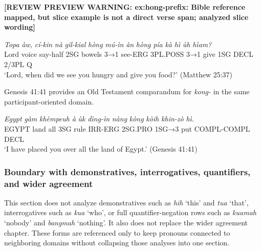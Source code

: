 \documentclass[
  11pt,
  a4paper,
]{article}
\newcommand{\tdim}[1]{\textit{#1}}
\newcommand{\tdimword}[1]{\textit{#1}}
\renewcommand{\textsc}[1]{{\footnotesize\MakeUppercase{#1}}}
\newcommand{\glossquote}[1]{`#1'}
\newcommand{\reviewwarninginline}[1]{\textbf{#1}\par\smallskip}
\begin{document}
\begin{exe}
\ex \label{ex:hong-prefix}
\reviewwarninginline{[REVIEW PREVIEW WARNING: ex:hong-prefix: Bible reference mapped, but slice example is not a direct verse span; analyzed slice wording]}
\gll \tdimword{Topa} \tdimword{àw,} \tdimword{cí-kin} \tdimword{nà} \tdimword{gil-kial} \tdimword{hòng} \tdimword{mú-ìn} \tdimword{àn} \tdimword{hòng} \tdimword{pía} \tdimword{kà} \tdimword{hì} \tdimword{ùh} \tdimword{hìam?} \\
     Lord voice say-half \textsc{2sg} bowels \textsc{3→1} see-\textsc{erg} \textsc{3pl}.\textsc{poss} \textsc{3→1} give \textsc{1sg} \textsc{decl} 2/3PL \textsc{q} \\
\glt \glossquote{Lord, when did we see you hungry and give you food?} (Matthew 25:37)
\end{exe}

Genesis 41:41 provides an Old Testament comparandum for \tdim{kong-} in
the same participant-oriented domain.

\begin{exe}
\ex \label{ex:kong-prefix}
\gll \tdimword{Egypt} \tdimword{gàm} \tdimword{khèmpeuh} \tdimword{à} \tdimword{ùk} \tdimword{dìng-ìn} \tdimword{nàng} \tdimword{kòng} \tdimword{kòih} \tdimword{khin-zò} \tdimword{hì.} \\
     \textsc{egypt} land all \textsc{3sg} rule \textsc{irr}-\textsc{erg} \textsc{2sg}.\textsc{pro} \textsc{1sg→3} put \textsc{compl}-\textsc{compl} \textsc{decl} \\
\glt \glossquote{I have placed you over all the land of Egypt.} (Genesis 41:41)
\end{exe}

\subsubsection{Boundary with demonstratives, interrogatives,
quantifiers, and wider
agreement}\label{boundary-with-demonstratives-interrogatives-quantifiers-and-wider-agreement}

This section does not analyze demonstratives such as \tdim{hih}
\glossquote{this} and \tdim{tua} \glossquote{that}, interrogatives such
as \tdim{kua} \glossquote{who}, or full quantifier-negation rows such as
\tdim{kuamah} \glossquote{nobody} and \tdim{bangmah}
\glossquote{nothing}. It also does not replace the wider agreement
chapter. These forms are referenced only to keep pronouns connected to
neighboring domains without collapsing those analyses into one section.
\end{document}
